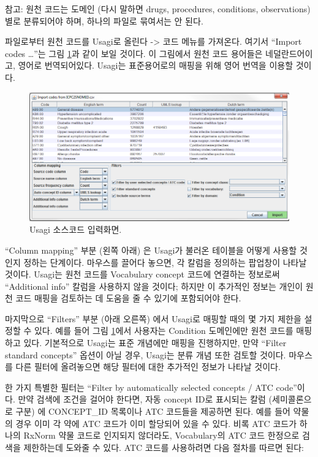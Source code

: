 \documentclass[11pt]{book}
\theoremstyle{definition}
\theoremstyle{definition}
\theoremstyle{definition}
\theoremstyle{remark}
\begin{document}
참고: 원천 코드는 도메인 (다시 말하면 drugs, procedures, conditions,
observations) 별로 분류되어야 하며, 하나의 파일로 묶여서는 안 된다.

파일로부터 원천 코드를 Usagi로 올린다 -\textgreater{} 코드 메뉴를
가져온다. 여기서 ``Import codes \ldots{}''는 그림
\ref{fig:usagiImport}과 같이 보일 것이다. 이 그림에서 원천 코드 용어들은
네덜란드어이고, 영어로 번역되어있다. Usagi는 표준용어로의 매핑을 위해
영어 번역을 이용할 것이다.

\begin{figure}

{\centering \includegraphics[width=1\linewidth]{images/ExtractTransformLoad/usagiImport} 

}

\caption{Usagi 소스코드 입력화면.}\label{fig:usagiImport}
\end{figure}

``Column mapping'' 부분 (왼쪽 아래) 은 Usagi가 불러온 테이블을 어떻게
사용할 것인지 정하는 단계이다. 마우스를 끌어다 놓으면, 각 칼럼을
정의하는 팝업창이 나타날 것이다. Usagi는 원천 코드를 Vocabulary concept
코드에 연결하는 정보로써 ``Additional info'' 칼럼을 사용하지 않을
것이다; 하지만 이 추가적인 정보는 개인이 원천 코드 매핑을 검토하는 데
도움을 줄 수 있기에 포함되어야 한다.

마지막으로 ``Filters'' 부분 (아래 오른쪽) 에서 Usagi로 매핑할 때의 몇
가지 제한을 설정할 수 있다. 예를 들어 그림 \ref{fig:usagiImport}에서
사용자는 Condition 도메인에만 원천 코드를 매핑하고 있다. 기본적으로
Usagi는 표준 개념에만 매핑을 진행하지만, 만약 ``Filter standard
concepts'' 옵션이 아닐 경우, Usagi는 분류 개념 또한 검토할 것이다.
마우스를 다른 필터에 올려놓으면 해당 필터에 대한 추가적인 정보가 나타날
것이다.

한 가지 특별한 필터는 ``Filter by automatically selected concepts / ATC
code''이다. 만약 검색에 조건을 걸어야 한다면, 자동 concept ID로 표시되는
칼럼 (세미콜론으로 구분) 에 CONCEPT\_ID 목록이나 ATC 코드들을 제공하면
된다. 예를 들어 약물의 경우 이미 각 약에 ATC 코드가 이미 할당되어 있을
수 있다. 비록 ATC 코드가 하나의 RxNorm 약물 코드로 인지되지 않더라도,
Vocabulary의 ATC 코드 한정으로 검색을 제한하는데 도와줄 수 있다. ATC
코드를 사용하려면 다음 절차를 따르면 된다:
\end{document}
